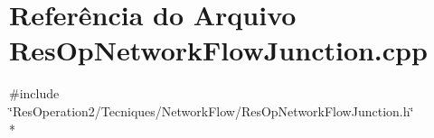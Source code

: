 \section{Referência do Arquivo Res\+Op\+Network\+Flow\+Junction.\+cpp}
\label{_res_op_network_flow_junction_8cpp}
{\ttfamily \#include \char`\"{}Res\+Operation2/\+Tecniques/\+Network\+Flow/\+Res\+Op\+Network\+Flow\+Junction.\+h\char`\"{}}\\*
